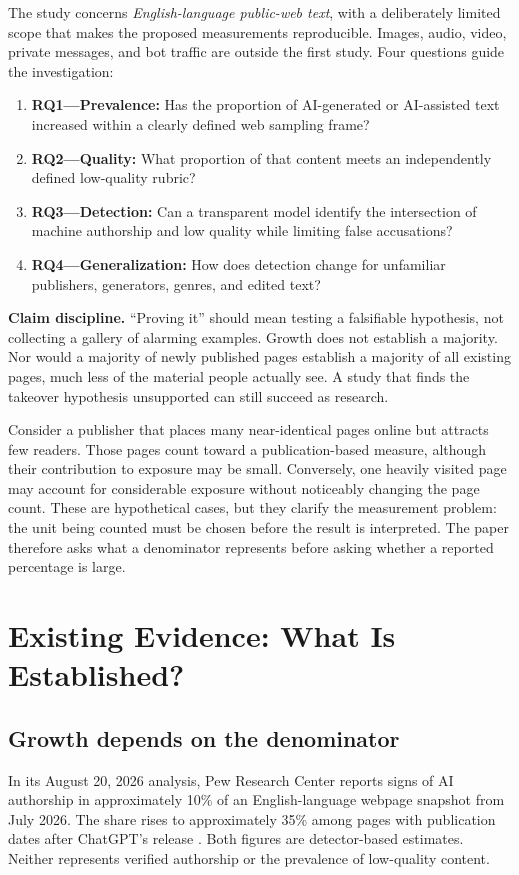 \documentclass[11pt]{article}
\begin{document}
The study concerns \emph{English-language public-web text}, with a deliberately
limited scope that makes the proposed measurements reproducible. Images,
audio, video, private messages, and bot traffic are outside the first study.
Four questions guide the investigation:
\begin{enumerate}
\item \textbf{RQ1---Prevalence:} Has the proportion of AI-generated or
AI-assisted text increased within a clearly defined web sampling frame?
\item \textbf{RQ2---Quality:} What proportion of that content meets an
independently defined low-quality rubric?
\item \textbf{RQ3---Detection:} Can a transparent model identify the intersection
of machine authorship and low quality while limiting false accusations?
\item \textbf{RQ4---Generalization:} How does detection change for unfamiliar
publishers, generators, genres, and edited text?
\end{enumerate}

\textbf{Claim discipline.} ``Proving it'' should mean testing a falsifiable
hypothesis, not collecting a gallery of alarming examples. Growth does not
establish a majority. Nor would a majority of newly published pages establish
a majority of all existing pages, much less of the material people actually
see. A study that finds the takeover hypothesis unsupported can still succeed
as research.

Consider a publisher that places many near-identical pages online but attracts
few readers. Those pages count toward a publication-based measure, although
their contribution to exposure may be small. Conversely, one heavily visited
page may account for considerable exposure without noticeably changing the
page count. These are hypothetical cases, but they clarify the measurement
problem: the unit being counted must be chosen before the result is interpreted.
The paper therefore asks what a denominator represents before asking whether
a reported percentage is large.

\section{Existing Evidence: What Is Established?}
\subsection{Growth depends on the denominator}
In its August 20, 2026 analysis, Pew Research Center reports signs of AI
authorship in approximately 10\% of an English-language webpage snapshot from
July 2026. The share rises to approximately 35\% among pages with publication
dates after ChatGPT's release \cite{pew}. Both figures are detector-based
estimates. Neither represents verified authorship or the prevalence of
low-quality content.
\end{document}
